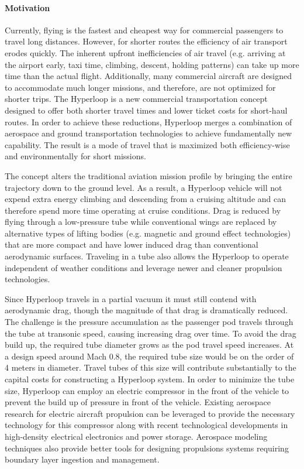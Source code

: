 \paragraph{Motivation}

    Currently, flying is the fastest and cheapest way for commercial
    passengers to travel long distances. However, for shorter routes the
    efficiency of air transport erodes quickly.
    The inherent upfront inefficiencies of air travel (e.g. arriving at the
    airport early, taxi time, climbing, descent, holding patterns)
    can take up more time than the actual flight.
    Additionally, many commercial aircraft are designed to accommodate much longer
    missions, and therefore, are not optimized for shorter trips.
    The Hyperloop is a new commercial transportation concept designed to offer
    both shorter travel times and lower ticket costs for short-haul routes.
    In order to achieve these reductions, Hyperloop merges a
    combination of aerospace and ground transportation technologies to achieve
    fundamentally new capability. The result is a mode of travel that is
    maximized both efficiency-wise and environmentally for short missions.

    The concept alters the traditional aviation mission profile by bringing
    the entire trajectory down to the ground level.
    As a result, a Hyperloop vehicle will not expend extra energy climbing
    and descending from a cruising altitude and can therefore spend more time
    operating at cruise conditions.
    Drag is reduced by flying through a low-pressure tube
    while conventional wings are replaced by alternative types of lifting bodies
    (e.g. magnetic and ground effect technologies) that are more compact and
    have lower induced drag than conventional aerodynamic surfaces.
    Traveling in a tube also allows the Hyperloop to operate independent of
    weather conditions and leverage newer and cleaner propulsion technologies.

    Since Hyperloop travels in a partial vacuum it must still contend with
    aerodynamic drag, though the magnitude of that drag is dramatically
    reduced. The challenge is the pressure accumulation as the passenger pod
    travels through the tube at transonic speed, causing increasing drag over time.
    To avoid the drag build up, the required tube diameter grows as the pod
    travel speed increases. At a design speed around Mach 0.8, the required tube
    size would be on the order of 4 meters in diameter. \cite{Chin}
    Travel tubes of this size will contribute
    substantially to the capital costs for constructing a Hyperloop system.
    In order to minimize the tube size, Hyperloop can employ an electric
    compressor in the front of the vehicle to prevent the build up
    of pressure in front of the vehicle. Existing aerospace research for
    electric aircraft propulsion can be leveraged to provide the necessary
    technology for this compressor along with recent technological developments
    in high-density electrical electronics and power storage. Aerospace modeling
    techniques also provide better tools for designing propulsions systems
    requiring boundary layer ingestion and management.

